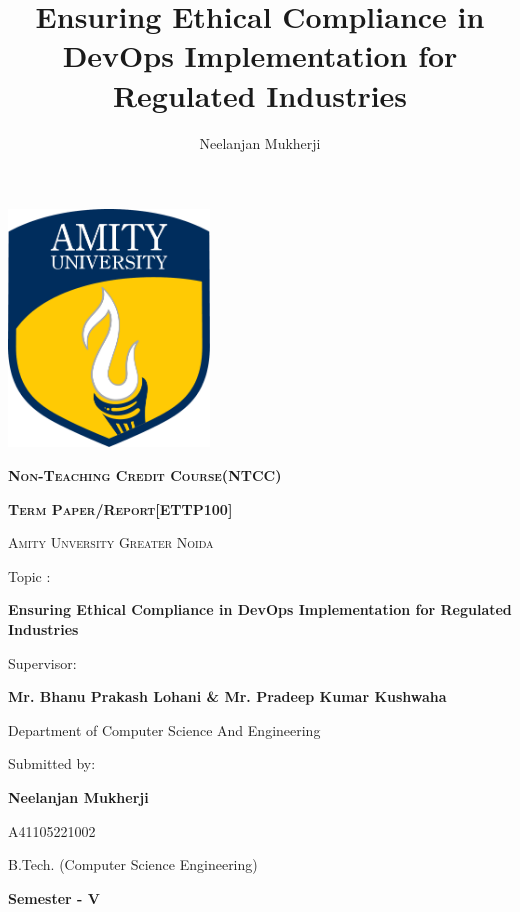 \documentclass{report}[12pt]
\title{\Huge\textbf{Ensuring Ethical Compliance in DevOps Implementation for Regulated Industries}}
\author{\Large Neelanjan Mukherji}
\begin{document}
\begin{titlepage}
    \centering
    \includegraphics[width=0.4\textwidth]{./Assets/Amity-Logo-Solo}\par
    \vspace*{0.1cm}
    {\scshape\Huge \textbf{Non-Teaching Credit Course(NTCC)} \par}
    {\scshape\Huge \textbf{Term Paper/Report[ETTP100]} \par}
    {\scshape\LARGE Amity Unversity Greater Noida \par}
    \vspace*{1cm}
    {\LARGE Topic : \par}
    \vspace*{0.3cm}
    {\Huge\textbf{Ensuring Ethical Compliance in DevOps Implementation for Regulated Industries}}\par
    \vspace{1cm}
    {\Large Supervisor:}\par

    {\Large \textbf{Mr. Bhanu Prakash Lohani \& Mr. Pradeep Kumar Kushwaha}}\par
    {\Large Department of Computer Science And Engineering}\par
    \vspace{1cm}
    {\Large Submitted by:}\par
    {\Large \textbf{Neelanjan Mukherji}}\par
    {\Large A41105221002}\par
    \vspace{1cm}
    {\Large B.Tech. (Computer Science Engineering)}\par
    {\Large \textbf{Semester - V}}\par
\end{titlepage}
\end{document}

